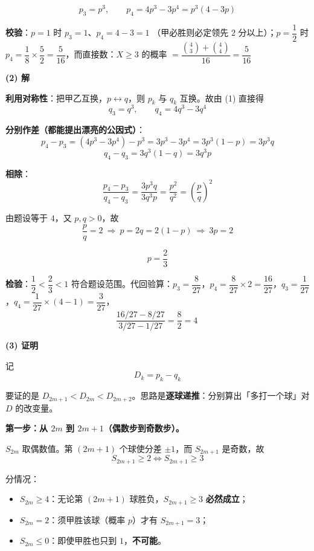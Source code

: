 \begin{answer}
\nopagebreak[4]
\[\boxed{p_3=p^3,\qquad p_4=4p^3-3p^4=p^3(4-3p)}\]

\textbf{校验}：$p=1$ 时 $p_3=1$、$p_4=4-3=1$ （甲必胜则必定领先 $2$ 分以上）；$p=\dfrac12$ 时 $p_4=\dfrac18\times\dfrac52=\dfrac5{16}$，而直接数：$X\ge3$ 的概率 $=\dfrac{\binom43+\binom44}{16}=\dfrac{5}{16}$ 

\par\medskip

\textbf{(2) 解}

\textbf{利用对称性}：把甲乙互换，$p\leftrightarrow q$，则 $p_k$ 与 $q_k$ 互换。故由 (1) 直接得
\nopagebreak[4]
\[q_3=q^3,\qquad q_4=4q^3-3q^4\]

\textbf{分别作差（都能提出漂亮的公因式）}：
\nopagebreak[4]
\[p_4-p_3=\left(4p^3-3p^4\right)-p^3=3p^3-3p^4=3p^3(1-p)=3p^3q\]
\nopagebreak[4]
\[q_4-q_3=3q^3(1-q)=3q^3p\]

\textbf{相除}：
\nopagebreak[4]
\[\frac{p_4-p_3}{q_4-q_3}=\frac{3p^3q}{3q^3p}=\frac{p^2}{q^2}=\left(\frac pq\right)^2\]

由题设等于 $4$，又 $p,q>0$，故
\nopagebreak[4]
\[\frac pq=2\ \Longrightarrow\ p=2q=2(1-p)\ \Longrightarrow\ 3p=2\]

\nopagebreak[4]
\[\boxed{p=\frac23}\]

\textbf{检验}：$\dfrac12<\dfrac23<1$  符合题设范围。代回验算：$p_3=\dfrac8{27}$，$p_4=\dfrac8{27}\times2=\dfrac{16}{27}$，$q_3=\dfrac1{27}$，$q_4=\dfrac1{27}\times\left(4-1\right)=\dfrac3{27}$，
\nopagebreak[4]
\[\frac{16/27-8/27}{3/27-1/27}=\frac{8}{2}=4\ \]

\par\medskip

\textbf{(3) 证明}

记
\nopagebreak[4]
\[D_k=p_k-q_k\]

要证的是 $D_{2m+1}<D_{2m}<D_{2m+2}$。思路是\textbf{逐球递推}：分别算出「多打一个球」对 $D$ 的改变量。

\par\medskip

\textbf{第一步：从 $2m$ 到 $2m+1$（偶数步到奇数步）。}

$S_{2m}$ 取偶数值。第 $(2m+1)$ 个球使分差 $\pm1$，而 $S_{2m+1}$ 是奇数，故
\nopagebreak[4]
\[S_{2m+1}\ge2\iff S_{2m+1}\ge3\]

分情况：

\begin{itemize}
\item $S_{2m}\ge4$：无论第 $(2m+1)$ 球胜负，$S_{2m+1}\ge3$ \textbf{必然成立}；
\item $S_{2m}=2$：须甲胜该球（概率 $p$）才有 $S_{2m+1}=3$；
\item $S_{2m}\le0$：即使甲胜也只到 $1$，\textbf{不可能}。
\end{itemize}


\end{answer}

